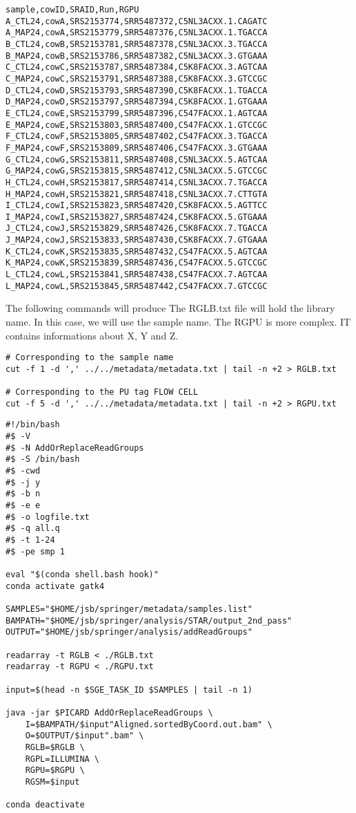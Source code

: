 \begin{verbatim}
sample,cowID,SRAID,Run,RGPU
A_CTL24,cowA,SRS2153774,SRR5487372,C5NL3ACXX.1.CAGATC
A_MAP24,cowA,SRS2153779,SRR5487376,C5NL3ACXX.1.TGACCA
B_CTL24,cowB,SRS2153781,SRR5487378,C5NL3ACXX.3.TGACCA
B_MAP24,cowB,SRS2153786,SRR5487382,C5NL3ACXX.3.GTGAAA
C_CTL24,cowC,SRS2153787,SRR5487384,C5K8FACXX.3.AGTCAA
C_MAP24,cowC,SRS2153791,SRR5487388,C5K8FACXX.3.GTCCGC
D_CTL24,cowD,SRS2153793,SRR5487390,C5K8FACXX.1.TGACCA
D_MAP24,cowD,SRS2153797,SRR5487394,C5K8FACXX.1.GTGAAA
E_CTL24,cowE,SRS2153799,SRR5487396,C547FACXX.1.AGTCAA
E_MAP24,cowE,SRS2153803,SRR5487400,C547FACXX.1.GTCCGC
F_CTL24,cowF,SRS2153805,SRR5487402,C547FACXX.3.TGACCA
F_MAP24,cowF,SRS2153809,SRR5487406,C547FACXX.3.GTGAAA
G_CTL24,cowG,SRS2153811,SRR5487408,C5NL3ACXX.5.AGTCAA
G_MAP24,cowG,SRS2153815,SRR5487412,C5NL3ACXX.5.GTCCGC
H_CTL24,cowH,SRS2153817,SRR5487414,C5NL3ACXX.7.TGACCA
H_MAP24,cowH,SRS2153821,SRR5487418,C5NL3ACXX.7.CTTGTA
I_CTL24,cowI,SRS2153823,SRR5487420,C5K8FACXX.5.AGTTCC
I_MAP24,cowI,SRS2153827,SRR5487424,C5K8FACXX.5.GTGAAA
J_CTL24,cowJ,SRS2153829,SRR5487426,C5K8FACXX.7.TGACCA
J_MAP24,cowJ,SRS2153833,SRR5487430,C5K8FACXX.7.GTGAAA
K_CTL24,cowK,SRS2153835,SRR5487432,C547FACXX.5.AGTCAA
K_MAP24,cowK,SRS2153839,SRR5487436,C547FACXX.5.GTCCGC
L_CTL24,cowL,SRS2153841,SRR5487438,C547FACXX.7.AGTCAA
L_MAP24,cowL,SRS2153845,SRR5487442,C547FACXX.7.GTCCGC
\end{verbatim}

The following commands will produce 
The RGLB.txt file will hold the library name. In this case, we will use the sample name.
The RGPU is more complex. IT contains informations about X, Y and Z.



\begin{verbatim}
# Corresponding to the sample name
cut -f 1 -d ',' ../../metadata/metadata.txt | tail -n +2 > RGLB.txt
 
# Corresponding to the PU tag FLOW CELL 
cut -f 5 -d ',' ../../metadata/metadata.txt | tail -n +2 > RGPU.txt
\end{verbatim}





\begin{verbatim}
#!/bin/bash
#$ -V
#$ -N AddOrReplaceReadGroups
#$ -S /bin/bash
#$ -cwd
#$ -j y
#$ -b n
#$ -e e
#$ -o logfile.txt
#$ -q all.q
#$ -t 1-24
#$ -pe smp 1

eval "$(conda shell.bash hook)"
conda activate gatk4	

SAMPLES="$HOME/jsb/springer/metadata/samples.list"
BAMPATH="$HOME/jsb/springer/analysis/STAR/output_2nd_pass"
OUTPUT="$HOME/jsb/springer/analysis/addReadGroups"	

readarray -t RGLB < ./RGLB.txt
readarray -t RGPU < ./RGPU.txt

input=$(head -n $SGE_TASK_ID $SAMPLES | tail -n 1)	

java -jar $PICARD AddOrReplaceReadGroups \
	I=$BAMPATH/$input"Aligned.sortedByCoord.out.bam" \
	O=$OUTPUT/$input".bam" \
	RGLB=$RGLB \
	RGPL=ILLUMINA \
	RGPU=$RGPU \
	RGSM=$input
	
conda deactivate
\end{verbatim}



